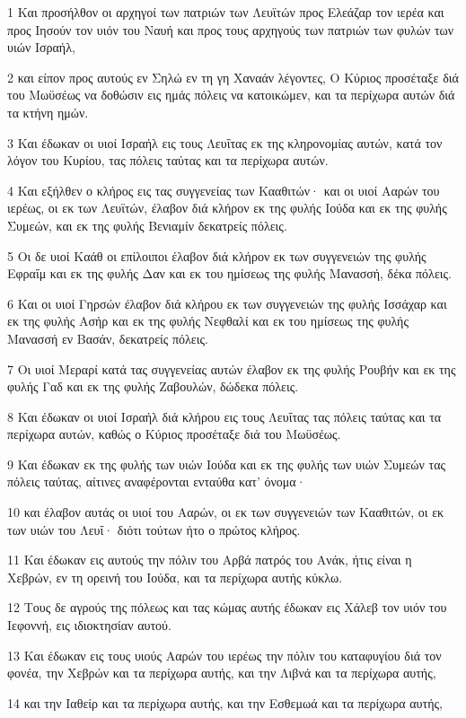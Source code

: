 \par 1 Και προσήλθον οι αρχηγοί των πατριών των Λευϊτών προς Ελεάζαρ τον ιερέα και προς Ιησούν τον υιόν του Ναυή και προς τους αρχηγούς των πατριών των φυλών των υιών Ισραήλ,
\par 2 και είπον προς αυτούς εν Σηλώ εν τη γη Χαναάν λέγοντες, Ο Κύριος προσέταξε διά του Μωϋσέως να δοθώσιν εις ημάς πόλεις να κατοικώμεν, και τα περίχωρα αυτών διά τα κτήνη ημών.
\par 3 Και έδωκαν οι υιοί Ισραήλ εις τους Λευΐτας εκ της κληρονομίας αυτών, κατά τον λόγον του Κυρίου, τας πόλεις ταύτας και τα περίχωρα αυτών.
\par 4 Και εξήλθεν ο κλήρος εις τας συγγενείας των Κααθιτών· και οι υιοί Ααρών του ιερέως, οι εκ των Λευϊτών, έλαβον διά κλήρον εκ της φυλής Ιούδα και εκ της φυλής Συμεών, και εκ της φυλής Βενιαμίν δεκατρείς πόλεις.
\par 5 Οι δε υιοί Καάθ οι επίλοιποι έλαβον διά κλήρον εκ των συγγενειών της φυλής Εφραΐμ και εκ της φυλής Δαν και εκ του ημίσεως της φυλής Μανασσή, δέκα πόλεις.
\par 6 Και οι υιοί Γηρσών έλαβον διά κλήρου εκ των συγγενειών της φυλής Ισσάχαρ και εκ της φυλής Ασήρ και εκ της φυλής Νεφθαλί και εκ του ημίσεως της φυλής Μανασσή εν Βασάν, δεκατρείς πόλεις.
\par 7 Οι υιοί Μεραρί κατά τας συγγενείας αυτών έλαβον εκ της φυλής Ρουβήν και εκ της φυλής Γαδ και εκ της φυλής Ζαβουλών, δώδεκα πόλεις.
\par 8 Και έδωκαν οι υιοί Ισραήλ διά κλήρου εις τους Λευΐτας τας πόλεις ταύτας και τα περίχωρα αυτών, καθώς ο Κύριος προσέταξε διά του Μωϋσέως.
\par 9 Και έδωκαν εκ της φυλής των υιών Ιούδα και εκ της φυλής των υιών Συμεών τας πόλεις ταύτας, αίτινες αναφέρονται ενταύθα κατ' όνομα·
\par 10 και έλαβον αυτάς οι υιοί του Ααρών, οι εκ των συγγενειών των Κααθιτών, οι εκ των υιών του Λευΐ· διότι τούτων ήτο ο πρώτος κλήρος.
\par 11 Και έδωκαν εις αυτούς την πόλιν του Αρβά πατρός του Ανάκ, ήτις είναι η Χεβρών, εν τη ορεινή του Ιούδα, και τα περίχωρα αυτής κύκλω.
\par 12 Τους δε αγρούς της πόλεως και τας κώμας αυτής έδωκαν εις Χάλεβ τον υιόν του Ιεφοννή, εις ιδιοκτησίαν αυτού.
\par 13 Και έδωκαν εις τους υιούς Ααρών του ιερέως την πόλιν του καταφυγίου διά τον φονέα, την Χεβρών και τα περίχωρα αυτής, και την Λιβνά και τα περίχωρα αυτής,
\par 14 και την Ιαθείρ και τα περίχωρα αυτής, και την Εσθεμωά και τα περίχωρα αυτής,

